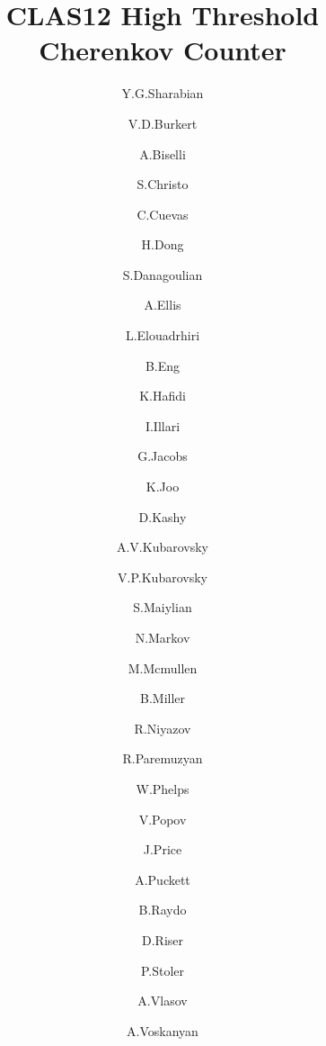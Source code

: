 \title{CLAS12 High Threshold Cherenkov Counter}

\author[1]{Y.G.Sharabian}
\author[1]{V.D.Burkert}
\author[2]{A.Biselli}
\author[1]{S.Christo}
\author[1]{C.Cuevas}
\author[1]{H.Dong}
\author[3]{S.Danagoulian}
\author[1]{A.Ellis}
\author[1]{L.Elouadrhiri}
\author[1]{B.Eng}
\author[4]{K.Hafidi}
\author[5]{I.Illari}
\author[1]{G.Jacobs}
\author[6]{K.Joo}
\author[1]{D.Kashy}
\author[6]{A.V.Kubarovsky}
\author[1]{V.P.Kubarovsky}
\author[7]{S.Maiylian}
\author[1]{N.Markov}
\author[1]{M.Mcmullen}
\author[1]{B.Miller}
\author[8]{R.Niyazov}
\author[9]{R.Paremuzyan}
\author[10]{W.Phelps}
\author[1]{V.Popov}
\author[11]{J.Price}
\author[6]{A.Puckett}
\author[1]{B.Raydo}
\author[6]{D.Riser}
\author[8]{P.Stoler}
\author[12]{A.Vlasov}
\author[7]{A.Voskanyan}

\address[1]{Thomas Jefferson National Accelerator Facility}
\address[2]{Fairfield University}
\address[3]{North Carolina Agricultural and Technical State University}
\address[4]{Argonne National Laboratory}
\address[5]{George Washington Univercity}
\address[6]{University of Connecticut}
\address[7]{Yerevan Physics Institute}
\address[8]{Rensselaer Polytechnic Institute}
\address[9]{University of New Hampshire}
\address[10]{Christopher Newport University}
\address[11]{California State University, Dominguez Hills}
\address[12]{National Research Centre Kurchatov Institute - ITEP}